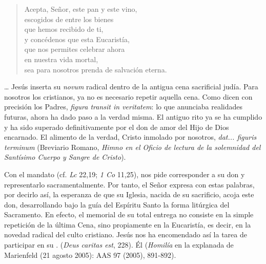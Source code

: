 \begin{liturgiabox}{}
	\begin{quote}	
		Acepta, Señor, este pan y este vino,
		\\escogidos de entre los bienes
		\\que hemos recibido de ti,
		\\y concédenos que esta Eucaristía,
		\\que nos permites celebrar ahora
		\\en nuestra vida mortal,
		\\sea para nosotros prenda de salvación eterna. 
	\end{quote}	
	\begin{liturgiatext}
		
		
		\ldots{} Jesús inserta su \emph{novum} radical dentro de la antigua cena sacrificial judía. Para nosotros los cristianos, ya no es necesario repetir aquella cena. Como dicen con precisión los Padres, \emph{figura transit in veritatem}: lo que anunciaba realidades futuras, ahora ha dado paso a la verdad misma. El antiguo rito ya se ha cumplido y ha sido superado definitivamente por el don de amor del Hijo de Dios encarnado. El alimento de la verdad, Cristo inmolado por nosotros, \emph{dat... figuris terminum} (Breviario Romano, \emph{Himno en el Oficio de lectura de la solemnidad del Santísimo Cuerpo y Sangre de Cristo}). 
		
		Con el mandato  (cf. \emph{Lc} 22,19; \emph{1 Co} 11,25), nos pide corresponder a su don y representarlo sacramentalmente. Por tanto, el Señor expresa con estas palabras, por decirlo así, la esperanza de que su Iglesia, nacida de su sacrificio, acoja este don, desarrollando bajo la guía del Espíritu Santo la forma litúrgica del Sacramento. En efecto, el memorial de su total entrega no consiste en la simple repetición de la última Cena, sino propiamente en la Eucaristía, es decir, en la novedad radical del culto cristiano. Jesús nos ha encomendado así la tarea de participar en su .  (\emph{Deus caritas est}, 228). Él (\emph{Homilía} en la explanada de Marienfeld (21 agosto 2005): AAS 97 (2005), 891-892). 
		

\end{liturgiatext}
\end{liturgiabox}
